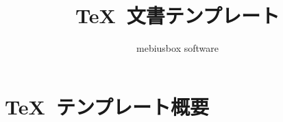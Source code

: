 

%
\newcommand{\spColumnColor}{cyan!10}
\title{\TeX\ 文書テンプレート}
\author{mebiusbox software}

    \pagestyle{empty} 
    \maketitle
    \setcounter{tocdepth}{2}
    \tableofcontents
    \cleardoublepage
    \pagestyle{\pixypagestyle}

    \chapter{\TeX\ テンプレート概要}
    
    
    
    
    
    

